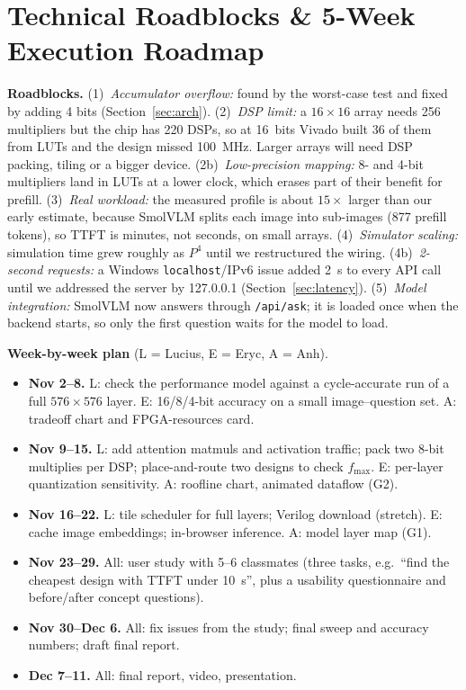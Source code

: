 \section{Technical Roadblocks \& 5-Week Execution Roadmap}
\label{sec:roadmap}

\textbf{Roadblocks.}
(1)~\emph{Accumulator overflow:} found by the worst-case test and fixed by
adding 4 bits (Section~\ref{sec:arch}).
(2)~\emph{DSP limit:} a $16\times16$ array needs 256 multipliers but the chip
has 220 DSPs, so at 16~bits Vivado built 36 of them from LUTs and the design
missed 100~MHz. Larger arrays will need DSP packing, tiling or a bigger device.
(2b)~\emph{Low-precision mapping:} 8- and 4-bit multipliers land in LUTs at
a lower clock, which erases part of their benefit for prefill.
(3)~\emph{Real workload:} the measured profile is about $15\times$ larger
than our early estimate, because SmolVLM splits each image into sub-images
(877 prefill tokens), so TTFT is minutes, not seconds, on small arrays.
(4)~\emph{Simulator scaling:} simulation time grew roughly as $P^4$ until we
restructured the wiring. (4b)~\emph{2-second requests:} a Windows
\texttt{localhost}/IPv6 issue added 2~s to every API call until we addressed
the server by 127.0.0.1 (Section~\ref{sec:latency}).
(5)~\emph{Model integration:} SmolVLM now answers through \texttt{/api/ask};
it is loaded once when the backend starts, so only the first question waits
for the model to load.

\textbf{Week-by-week plan} (L = Lucius, E = Eryc, A = Anh).
\begin{itemize}
  \setlength{\itemsep}{1pt}
  \item \textbf{Nov 2--8.} L: check the performance model against a
        cycle-accurate run of a full $576\times576$ layer. E: 16/8/4-bit
        accuracy on a small image--question set. A: tradeoff chart and
        FPGA-resources card.
  \item \textbf{Nov 9--15.} L: add attention matmuls and activation traffic;
        pack two 8-bit multiplies per DSP; place-and-route two designs to
        check $f_{\max}$. E: per-layer
        quantization sensitivity. A: roofline chart, animated dataflow (G2).
  \item \textbf{Nov 16--22.} L: tile scheduler for full layers; Verilog
        download (stretch). E: cache image embeddings; in-browser inference.
        A: model layer map (G1).
  \item \textbf{Nov 23--29.} All: user study with 5--6 classmates (three
        tasks, e.g.\ ``find the cheapest design with TTFT under 10~s'', plus
        a usability questionnaire and before/after concept questions).
  \item \textbf{Nov 30--Dec 6.} All: fix issues from the study; final sweep
        and accuracy numbers; draft final report.
  \item \textbf{Dec 7--11.} All: final report, video, presentation.
\end{itemize}
